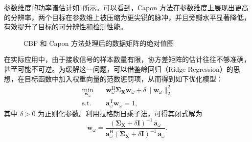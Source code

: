 \begin{solution}
    参数维度的功率谱估计如\cref{fig_compressed_capon2}所示。可以看到，Capon 方法在参数维度上展现出更高的分辨率，两个目标在参数维上被压缩为更尖锐的脉冲，并且旁瓣水平显著降低，有效提升了目标的可分辨性和检测性能。
    \begin{figure}[htb!]
        \centering
        \caption{CBF 和 Capon 方法处理后的数据矩阵的绝对值图}
        \label{fig_compressed_capon2}
    \end{figure}
\end{solution}


在实际应用中，由于接收信号的样本数量有限，协方差矩阵的估计往往不够准确，甚至可能不可逆。为缓解这一问题，可以借鉴岭回归（Ridge Regression）的思想，在目标函数中加入权重向量的范数惩罚项，从而得到如下优化模型：
\[
    \begin{aligned}
        \min_{\bm{w}_{\omega}} \quad &
        \bm{w}_{\omega}^{\mathrm{H}} \mathbf{\Sigma}_{\mathbf{X}} \bm{w}_{\omega}
        + \delta \|\bm{w}_{\omega}\|_2^2                                                 \\
        \text{s.t.} \quad            & \bm{a}_{\omega}^{\mathrm{T}} \bm{w}_{\omega} = 1,
    \end{aligned}
\]
其中 \(\delta > 0\) 为正则化参数。利用拉格朗日乘子法，可得其闭式解为
\[
    \bm{w}_{\omega}
    = \frac{(\mathbf{\Sigma}_{\mathbf{X}} + \delta \mathbf{I})^{-1} \,\overline{\bm{a}}_{\omega}}
    {\overline{\bm{a}}_{\omega}^{\mathrm{H}} (\mathbf{\Sigma}_{\mathbf{X}} + \delta \mathbf{I})^{-1} \,\overline{\bm{a}}_{\omega}}.
\]

